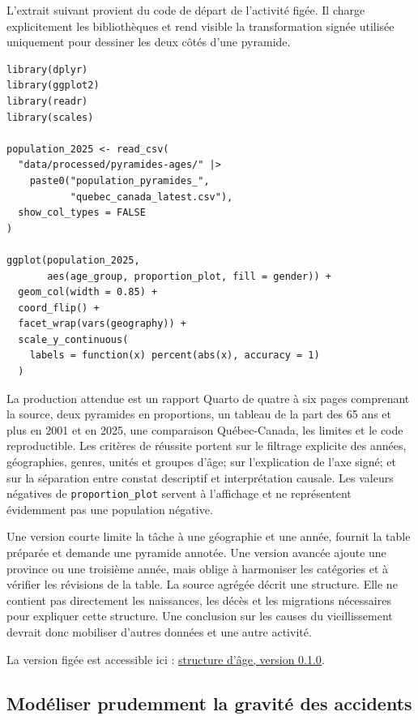 L'extrait suivant provient du code de départ de l'activité figée. Il charge explicitement les bibliothèques et rend visible la transformation signée utilisée uniquement pour dessiner les deux côtés d'une pyramide.

\begin{small}
\begin{verbatim}
library(dplyr)
library(ggplot2)
library(readr)
library(scales)

population_2025 <- read_csv(
  "data/processed/pyramides-ages/" |>
    paste0("population_pyramides_",
           "quebec_canada_latest.csv"),
  show_col_types = FALSE
)

ggplot(population_2025,
       aes(age_group, proportion_plot, fill = gender)) +
  geom_col(width = 0.85) +
  coord_flip() +
  facet_wrap(vars(geography)) +
  scale_y_continuous(
    labels = function(x) percent(abs(x), accuracy = 1)
  )
\end{verbatim}
\end{small}

La production attendue est un rapport Quarto de quatre à six pages comprenant la source, deux pyramides en proportions, un tableau de la part des 65 ans et plus en 2001 et en 2025, une comparaison Québec-Canada, les limites et le code reproductible. Les critères de réussite portent sur le filtrage explicite des années, géographies, genres, unités et groupes d'âge; sur l'explication de l'axe signé; et sur la séparation entre constat descriptif et interprétation causale. Les valeurs négatives de \texttt{proportion\_plot} servent à l'affichage et ne représentent évidemment pas une population négative.

Une version courte limite la tâche à une géographie et une année, fournit la table préparée et demande une pyramide annotée. Une version avancée ajoute une province ou une troisième année, mais oblige à harmoniser les catégories et à vérifier les révisions de la table. La source agrégée décrit une structure. Elle ne contient pas directement les naissances, les décès et les migrations nécessaires pour expliquer cette structure. Une conclusion sur les causes du vieillissement devrait donc mobiliser d'autres données et une autre activité.

La version figée est accessible ici : \href{https://github.com/AurelienNicosiaULaval/donnees-bleues/blob/v0.1.0/datasets/pyramides-ages/activite-longue.qmd}{structure d'âge, version 0.1.0}.

\subsection{Modéliser prudemment la gravité des accidents}

